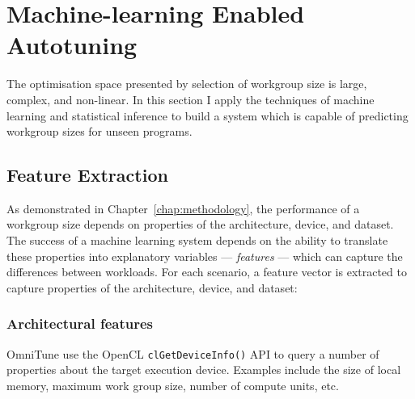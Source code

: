 





\section{Machine-learning Enabled Autotuning}

The optimisation space presented by selection of workgroup size is
large, complex, and non-linear. In this section I apply the techniques
of machine learning and statistical inference to build a system which
is capable of predicting workgroup sizes for unseen programs.


\subsection{Feature Extraction}

As demonstrated in Chapter~\ref{chap:methodology}, the performance of
a workgroup size depends on properties of the architecture, device,
and dataset. The success of a machine learning system depends on the
ability to translate these properties into explanatory variables ---
\emph{features} --- which can capture the differences between
workloads. For each scenario, a feature vector is extracted to capture
properties of the architecture, device, and dataset:


\subsubsection{Architectural features}

OmniTune use the OpenCL \texttt{clGetDeviceInfo()} API to query a
number of properties about the target execution device. Examples
include the size of local memory, maximum work group size, number of
compute units, etc.


